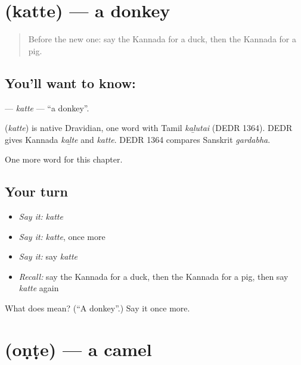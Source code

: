 \section[\texorpdfstring{\kn{ಕತ್ತೆ} (katte)}{ಕತ್ತೆ (katte)}]{ (katte) — a donkey}

\label{lesson:KA-C133-katte}



\begin{quote}
Before the new one: say the Kannada for a duck, then the Kannada for a pig.
\end{quote}

\subsection*{You'll want to know: }
\textbf{} — \emph{katte} — \textquotedblleft{}a donkey\textquotedblright{}.

\begin{cousinweb}
\textbf{} (\emph{katte}) is native Dravidian, one word with Tamil \emph{kaḻutai} (DEDR 1364). DEDR gives Kannada \emph{kaḻte} and \emph{katte}. DEDR 1364 compares Sanskrit \emph{gardabha}.
\end{cousinweb}

\begin{grammarlens}[title={What you've built}]
One more word for this chapter.
\end{grammarlens}

\subsection*{Your turn}
\begin{itemize}
\raggedright
  \item \emph{Say it:} \emph{katte}
  \item \emph{Say it:} \emph{katte}, once more
  \item \emph{Say it:} say \emph{katte}
  \item \emph{Recall:} say the Kannada for a duck, then the Kannada for a pig, then say \emph{katte} again
\end{itemize}

\begin{tcolorbox}[breakable,colback=teal!4,colframe=teal!35!black,title={Before you move on}]
What does  mean? (\textquotedblleft{}A donkey\textquotedblright{}.) Say it once more.
\end{tcolorbox}
\section[\texorpdfstring{\kn{ಒಂಟೆ} (oṇṭe)}{ಒಂಟೆ (oṇṭe)}]{ (oṇṭe) — a camel}

